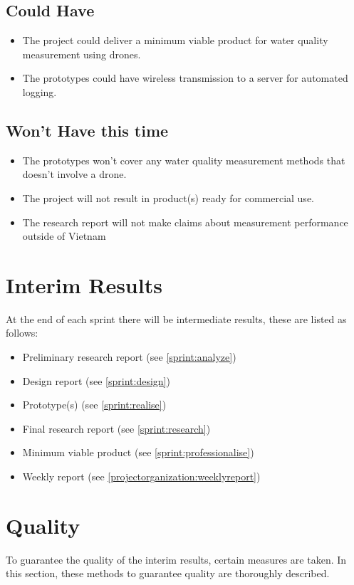 \documentclass[11pt, a4paper]{article}
\begin{document}
\subsection{Could Have}
\begin{itemize}
  \item The project could deliver a minimum viable product for water quality measurement using drones.
  \item The prototypes could have wireless transmission to a server for automated logging.
\end{itemize}
\subsection{Won’t Have this time}
\begin{itemize}
  \item The prototypes won't cover any water quality measurement methods that doesn't involve a drone.
  \item The project will not result in product(s) ready for commercial use.
  \item The research report will not make claims about measurement performance outside of Vietnam
\end{itemize}

\section{Interim Results}\label{interimresults}
At the end of each sprint there will be intermediate results, these are listed as follows:
\begin{itemize}
  \item Preliminary research report (see \ref{sprint:analyze})
  \item Design report (see \ref{sprint:design})
  \item Prototype(s) (see \ref{sprint:realise})
  \item Final research report (see \ref{sprint:research})
  \item Minimum viable product (see \ref{sprint:professionalise})
  \item Weekly report (see \ref{projectorganization:weeklyreport})
\end{itemize}

\section{Quality}
To guarantee the quality of the interim results, certain measures are taken. In this section, these methods to guarantee quality are thoroughly described.
\end{document}
